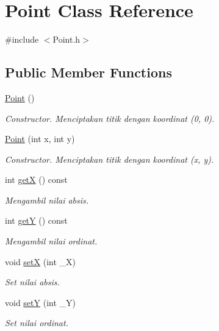 \hypertarget{classPoint}{\section{Point Class Reference}
\label{classPoint}
}


{\ttfamily \#include $<$Point.\+h$>$}

\subsection*{Public Member Functions}
\begin{DoxyCompactItemize}
\item 
\hypertarget{classPoint_ad92f2337b839a94ce97dcdb439b4325a}{\hyperlink{classPoint_ad92f2337b839a94ce97dcdb439b4325a}{Point} ()}\label{classPoint_ad92f2337b839a94ce97dcdb439b4325a}

\begin{DoxyCompactList}\small\item\em Constructor. Menciptakan titik dengan koordinat (0, 0). \end{DoxyCompactList}\item 
\hyperlink{classPoint_a001c4958c310b248f5c26037aea38a9c}{Point} (int x, int y)
\begin{DoxyCompactList}\small\item\em Constructor. Menciptakan titik dengan koordinat (x, y). \end{DoxyCompactList}\item 
int \hyperlink{classPoint_abe622fffc8785b0c2e06cdac681b9837}{get\+X} () const 
\begin{DoxyCompactList}\small\item\em Mengambil nilai absis. \end{DoxyCompactList}\item 
int \hyperlink{classPoint_a10f31e48e2dbc22e3660ca769b8d5d65}{get\+Y} () const 
\begin{DoxyCompactList}\small\item\em Mengambil nilai ordinat. \end{DoxyCompactList}\item 
void \hyperlink{classPoint_a89315778ce0a9175ae1a1898a93b71db}{set\+X} (int \+\_\+\+X)
\begin{DoxyCompactList}\small\item\em Set nilai absis. \end{DoxyCompactList}\item 
void \hyperlink{classPoint_a5f78572e1b8dfbace3819c3f020f3784}{set\+Y} (int \+\_\+\+Y)
\begin{DoxyCompactList}\small\item\em Set nilai ordinat. \end{DoxyCompactList}\end{DoxyCompactItemize}


